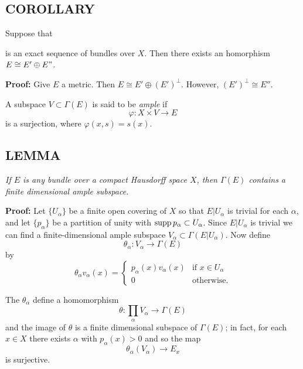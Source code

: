 \subsection{COROLLARY} Suppose that  is an exact sequence of bundles over $X$. Then there exists an homorphism $E \cong E' \oplus E"$. \par 

\textbf{Proof:} Give $E$ a metric. Then $E \cong E' \oplus (E')^\bot$. However, $(E')^\bot \cong E''$. \par \hfill

A subspace $V \subset \Gamma(E)$ is said to be \textit{ample} if
\begin{equation*}
    \varphi: X \times V \to E
\end{equation*}
is a surjection, where $\varphi(x, s) = s(x)$.

\subsection{LEMMA}\label{1.4.12} \textit{If $E$ is any bundle over a compact Hausdorff space $X$, then $\Gamma(E)$ contains a finite dimensional ample subspace.} \par 

\textbf{Proof:} Let $\{U_\alpha\}$ be a finite open covering of $X$ so that $E \vert U_\alpha$ is trivial for each $\alpha$, and let $\{p_\alpha\}$ be a partition of unity with $\operatorname{supp} p_\alpha \subset U_\alpha$. Since $E \vert U_\alpha$ is trivial we can find a finite-dimensional ample subspace $V_\alpha \subset \Gamma(E \vert U_\alpha)$. Now define
\begin{equation*}
    \theta_\alpha: V_\alpha \to \Gamma(E)
\end{equation*}
by
\begin{equation*}
\theta_\alpha v_\alpha(x) =
    \begin{cases}
        p_\alpha(x) v_\alpha(x) & \text{if $x \in U_\alpha$} \\
        0 & \text{otherwise.}
    \end{cases}
\end{equation*}

The $\theta_\alpha$ define a homomorphism
\begin{equation*}
    \theta: \prod_\alpha V_\alpha \to \Gamma(E)
\end{equation*}
and the image of $\theta$ is a finite dimensional subspace of $\Gamma(E)$; in fact, for each $x \in X$ there exists $\alpha$ with $p_\alpha(x) > 0$ and so the map
\begin{equation*}
    \theta_\alpha(V_\alpha) \to E_x
\end{equation*}
is surjective. \par 

